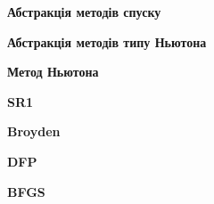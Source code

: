 

\vspace{0.5cm}
\noindent \textbf{Абстракція методів спуску}



\vspace{0.5cm}
\noindent \textbf{Абстракція методів типу Ньютона}



\vspace{0.5cm}
\noindent \textbf{Метод Ньютона}



\vspace{0.5cm}
\noindent \textbf{SR1}



\vspace{0.5cm}
\noindent \textbf{Broyden}



\vspace{0.5cm}
\noindent \textbf{DFP}



\vspace{0.5cm}
\noindent \textbf{BFGS}

